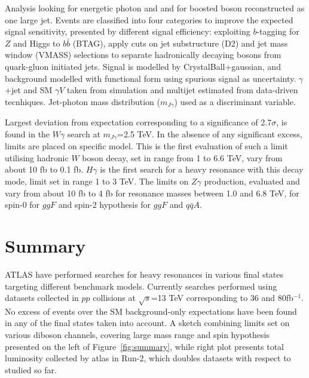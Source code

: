 \documentclass{PoS}
\begin{document}
Analysis looking for energetic photon and and for boosted boson reconstructed as one large jet.
Events are classified into four categories to improve the expected signal sensitivity, presented by different signal efficiency:
exploiting $b$-tagging for $Z$ and Higgs to $b\bar{b}$ (BTAG), apply cuts on jet substructure (D2) and jet mass window (VMASS) selections to separate hadronically decaying bosons from quark-gluon initiated jets.
Signal is modelled by CrystalBall+gaussian, and background modelled with functional form using spurious signal as uncertainty. $\gamma$+jet and SM $\gamma V$ taken from simulation and multijet estimated from data-driven tecnhiques.
Jet-photon mass distribution ($m_{J \gamma}$) used as a discriminant variable. %

Largest deviation from expectation corresponding to a significance of 2.7$\sigma$, is found in the $W\gamma$ search at $m_{J \gamma}$=2.5 TeV.
In the absence of any significant excess, limits are placed on specific model.
This is the first evaluation of such a limit utilising hadronic $W$ boson decay, set in range from 1 to 6.6 TeV, vary from about 10 fb to 0.1 fb. 
$H\gamma$ is the first search for a heavy resonance with this decay mode, limit set in range 1 to 3 TeV.
The limits on $Z\gamma$ production, evaluated and vary from about 10 fb to 4 fb for resonance masses between 1.0 and 6.8 TeV, for spin-0 for $ggF$ and spin-2 hypothesis for $ggF$ and $q\bar{q}A$.


\section{Summary}
\label{sec:sum}

ATLAS have performed searches for heavy resonances in various final states targeting different benchmark models.
Currently searches performed using datasets collected in $pp$ collisions at $\sqrt{s}$=13 TeV corresponding to 36 and 80fb$^{-1}$.
No excess of events over the SM background-only expectations have been found in any of the final states taken into account. 
A sketch combining limits set on various diboson channels, covering large mass range and spin hypothesis presented on the left of Figure~\ref{fig:summary}, while right plot presents total luminosity collected by atlas in Run-2, which doubles datasets with respect to studied so far.
\end{document}
